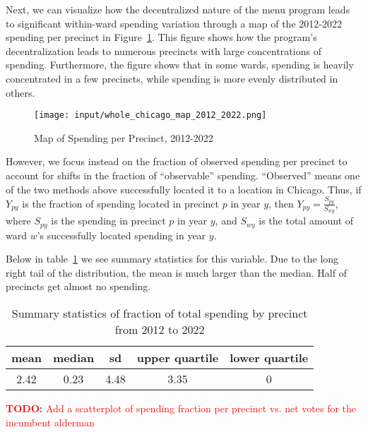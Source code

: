 Next, we can visualize how the decentralized nature of the menu program leads to significant within-ward spending variation through a map of the 2012-2022 spending per precinct in Figure~\ref{fig:spending_map}.
This figure shows how the program's decentralization leads to numerous precincts with large concentrations of spending.
Furthermore, the figure shows that in some wards, spending is heavily concentrated in a few precincts, while spending is more evenly distributed in others.

\begin{figure}[H]
    \centering
    \texttt{[image: input/whole\_chicago\_map\_2012\_2022.png]}
    \caption{Map of Spending per Precinct, 2012-2022}
    \label{fig:spending_map}
\end{figure}

However, we focus instead on the fraction of observed spending per precinct to account for shifts in the fraction of ``observable'' spending.
``Observed'' means one of the two methods above successfully located it to a location in Chicago.
Thus, if $Y_{py}$ is the fraction of spending located in precinct $p$ in year $y$, then $Y_{py} = \frac{S_{py}}{S_{wy}}$, where $S_{py}$ is the spending in precinct $p$ in year $y$, and $S_{wy}$ is the total amount of ward $w$'s successfully located spending in year $y$.

Below in table~\ref{summary_stats} we see summary statistics for this variable.
Due to the long right tail of the distribution, the mean is much larger than the median.
Half of precincts get almost no spending.

\begin{table}
\caption{Summary statistics of fraction of total spending by precinct from 2012 to 2022}\label{summary_stats}
\centering
\begin{tabular}[t]{ccccc}
\toprule
mean & median & sd & upper quartile & lower quartile\\
\midrule
2.42 & 0.23 & 4.48 & 3.35 & 0\\
\bottomrule
\end{tabular}
\end{table}

\textcolor{red}{\textbf{TODO:} Add a scatterplot of spending fraction per precinct vs. net votes for the incumbent alderman}